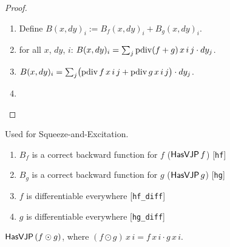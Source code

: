 \begin{proof}
\leanok
\begin{enumerate}
  \item Define \(B(x, dy)_i := B_f(x, dy)_i + B_g(x, dy)_i\).
  \item \Suffices{} for all \(x\), \(dy\), \(i\):
    \(B(x, dy)_i = \sum_j \operatorname{pdiv}(f + g)\, x\, i\, j \cdot dy_j\).
  \item \(B(x, dy)_i = \sum_j \bigl(\operatorname{pdiv} f\, x\, i\, j
          + \operatorname{pdiv} g\, x\, i\, j\bigr) \cdot dy_j\).
  \item \Qed{}
\end{enumerate}
\end{proof}

\begin{theorem}
  \label{thm:elemwiseProductHasVJP}
  \leanok
  Used for Squeeze-and-Excitation.
  \Assume{}
  \begin{enumerate}
    \item \(B_f\) is a correct backward function for \(f\)
          (\(\mathsf{HasVJP}\, f\)) \hfill[\texttt{hf}]
    \item \(B_g\) is a correct backward function for \(g\)
          (\(\mathsf{HasVJP}\, g\)) \hfill[\texttt{hg}]
    \item \(f\) is differentiable everywhere \hfill[\texttt{hf\_diff}]
    \item \(g\) is differentiable everywhere \hfill[\texttt{hg\_diff}]
  \end{enumerate}
  \Prove{} \(\mathsf{HasVJP}\, (f \odot g)\), where
  \((f \odot g)\, x\, i = f\,x\,i \cdot g\,x\,i\).
\end{theorem}

